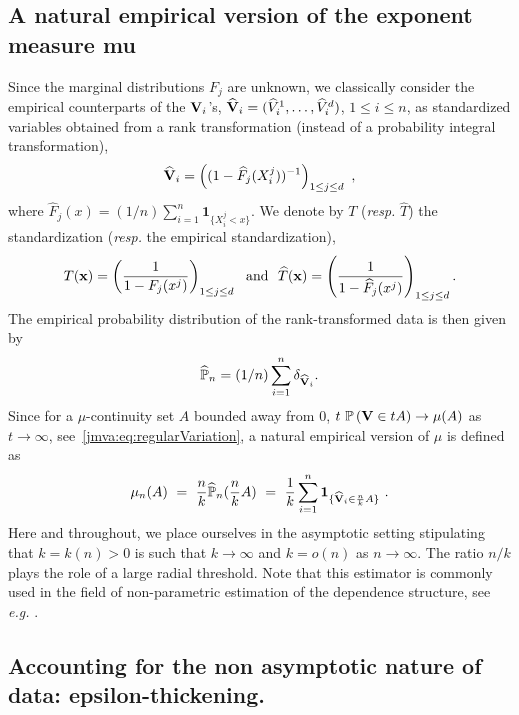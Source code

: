 \subsection{A natural empirical version of the exponent measure mu}
\label{jmva:sec:classicEstimators}
 Since the marginal distributions $F_j$ are unknown, we classically consider
the empirical counterparts of the $\mathbf V_i$'s, 
$\mathbf{\widehat  V}_i = (\widehat V_i^1, \ldots,\widehat
V_i^d)$, $1\le i\le n$, as standardized  variables obtained from a
rank transformation (instead of a probability integral
transformation),  
\[\mathbf{\widehat  V}_i = \left( ( 1- \widehat F_j
  (X_i^j))^{-1}\right)_{1 \le j \le d}~, \]
  where 
$\widehat F_j (x) = (1/n) \sum_{i=1}^n \mathbf{1}_{\{X_i^j < x\}}$.
%
We denote by $T$ (\emph{resp.} $\widehat T$) the standardization
(\textit{resp.} the empirical standardization), 
\begin{align}
\label{jmva:def:transform}
T(\mathbf x) = \left( \frac{1}{1- F_j (x^j)}\right)_{1\leq j\leq d}
\text{~~and~~}
\widehat T(\mathbf x) = \left( \frac{1}{1- \widehat F_j(x^j)}\right)_{1\leq j\leq d}. 
\end{align}
The empirical probability distribution of the rank-transformed data is then given by
\begin{align*}
\mathbb{\widehat P}_n=(1/n)\sum_{i=1}^n\delta_{\mathbf{\widehat{V}}_i}.
\end{align*}
Since for a $\mu$-continuity set $A$ bounded away from $0$,   $t~ \mathbb{P}\left( \mathbf V \in t A\right)  \to \mu(A)$ as $t \to \infty$, see~\eqref{jmva:eq:regularVariation}, a natural empirical version of $\mu$ is defined as 
\begin{align}\label{jmva:mu_n}
\mu_n(A) ~=~ \frac{n}{k} \widehat{\mathbb{P}}_n (\frac{n}{k}A) ~=~ \frac{1}{k}\sum_{i=1}^n \mathbf{1}_{\{\mathbf{\widehat{V}}_i \in \frac{n}{k} A\}}~.
\end{align}
 Here and throughout, we place ourselves in the asymptotic setting stipulating that $k = k(n) >0$ is such that $k \to \infty$ and $k = o(n)$ as $n \to \infty$.
The ratio $n/k$ plays the role of a large radial threshold.
Note that this estimator is commonly used in the field of
non-parametric estimation of the dependence structure, see \textit{e.g.}
\cite{Einmahl2009}. 


\subsection{Accounting for the  non asymptotic nature of  data:
  epsilon-thickening.}

